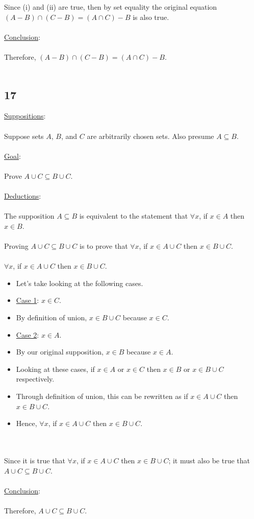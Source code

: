 \documentclass[12pt]{article}
\newcommand{\xlist}[1]{
    \begin{itemize}
        \renewcommand{\labelitemi}{$\centerdot$}
        #1
    \end{itemize}
    \newblock
    \\ \\
}
\newcommand{\xsupposition}[1]{
    \underline{Suppositions}:
    \\ \\
    #1
    \\ \\
}
\newcommand{\xgoal}[1]{
    \underline{Goal}:
    \\ \\
    #1
    \\ \\
}
\newcommand{\xdeduction}{
    \underline{Deductions}:
    \\ \\
}
\newcommand{\xconclusion}[1]{
    \underline{Conclusion}:
    \\ \\
    #1
    \\ \\
}
\begin{document}
Since (i) and (ii) are true, then by set equality the original equation $(A-B)\cap(C-B) = (A \cap C)-B$ is also true.
\\ \\
\xconclusion{Therefore, $(A-B)\cap(C-B) = (A \cap C)-B$.}

\subsection*{17}

\xsupposition{Suppose sets $A$, $B$, and $C$ are arbitrarily chosen sets. Also presume $A \subseteq B$.}
\xgoal{Prove $A \cup C \subseteq B \cup C$.}
\xdeduction
The supposition $A \subseteq B$ is equivalent to the statement that $\forall x$, if $x \in A$ then $x \in B$.
\\ \\
Proving $A \cup C \subseteq B \cup C$ is to prove that $\forall x$, if $x \in A \cup C$ then $x \in B \cup C$. 
\\ \\
$\forall x$, if $x \in A \cup C$ then $x \in B \cup C$.
\xlist{
  \item Let's take looking at the following cases.
  \item \underline {Case 1}: $x \in C$.
  \item By definition of union, $x \in B \cup C$ because $x \in C$.
  \item \underline{Case 2}: $x \in A$.
  \item By our original supposition, $x \in B$ because $x \in A$.
  \item Looking at these cases, if $x \in A$ or $x \in C$ then $x \in B$ or $x \in B \cup C$ respectively.
  \item Through definition of union, this can be rewritten as if $x \in A \cup C$ then $x \in B \cup C$.
  \item Hence, $\forall x$, if $x \in A \cup C$ then $x \in B \cup C$.
}
Since it is true that  $\forall x$, if $x \in A \cup C$ then $x \in B \cup C$; it must also be true that $A \cup C \subseteq B \cup C$. 
\\ \\
\xconclusion{Therefore, $A \cup C \subseteq B \cup C$.}
\end{document}
